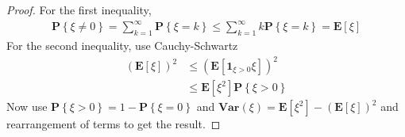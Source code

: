 \documentclass{amsbook}
\theoremstyle{definition}
\theoremstyle{remark}
\newcommand{\expectation}[1]{\textbf{E}\left[#1\right]}
\newcommand{\variance}[1]{\textbf{Var} \left (#1 \right )}
\newcommand{\probability}[1]{\textbf{P}\left \{#1 \right \}}
\newcommand{\characteristic}[1]{\textbf{1}_{#1}}
\begin{document}
\begin{proof}
For the first inequality,
\begin{align*}
\probability{\xi \neq 0} = \sum_{k=1}^\infty \probability{\xi = k} \leq
\sum_{k=1}^\infty k\probability{\xi = k} = \expectation{\xi}
\end{align*}
For the second inequality, use Cauchy-Schwartz
\begin{align*}
\left(\expectation{\xi}\right)^2 &\leq
\left(\expectation{\characteristic{\xi > 0}\xi}\right)^2 \\
&\leq \expectation{\xi^2} \probability{\xi > 0}
\end{align*}
Now use $\probability{\xi > 0} = 1 - \probability{\xi=0}$ and
$\variance{\xi} = \expectation{\xi^2} -
\left(\expectation{\xi}\right)^2$ and rearrangement of terms to get
the result.
\end{proof}
\end{document}
